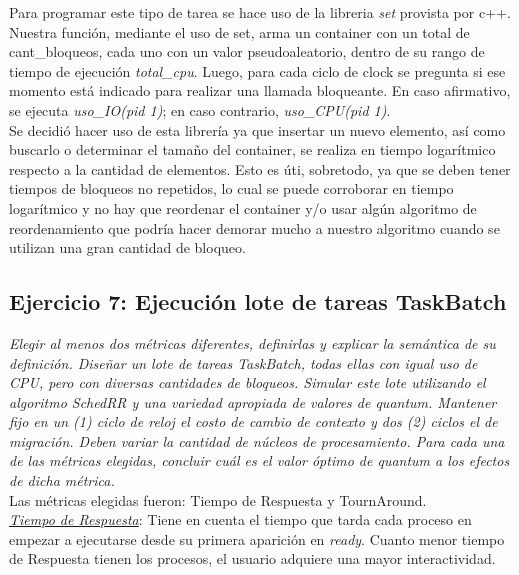\documentclass[a4paper]{article}
\begin{document}
Para programar este tipo de tarea se hace uso de la libreria \emph{set} provista por c++. Nuestra funci\'on, mediante el uso de set, arma un container con un total de cant_bloqueos, cada uno con un valor pseudoaleatorio, dentro de su rango de tiempo de ejecuci\'on \emph{total_cpu}. 
Luego, para cada ciclo de clock se pregunta si ese momento est\'a indicado para realizar una llamada bloqueante. En caso afirmativo, se ejecuta \textit{uso_IO(pid 1)}; en caso contrario, \textit{uso_CPU(pid 1)}.\\
Se decidió hacer uso de esta librería ya que insertar un nuevo elemento, así como buscarlo o determinar el tamaño del container, se realiza en tiempo logarítmico respecto a la cantidad de elementos. Esto es úti, sobretodo, ya que se deben tener tiempos de bloqueos no repetidos, lo cual se puede corroborar en tiempo logarítmico y no hay que reordenar el container y/o usar algún algoritmo de reordenamiento que podría hacer demorar mucho a nuestro algoritmo cuando se utilizan una gran cantidad de bloqueo. 

\bigskip 
 \subsection{Ejercicio 7: Ejecuci\'on lote de tareas TaskBatch}
\textit{Elegir al menos dos m\'etricas diferentes, definirlas y explicar la sem\'antica de su definici\'on. Dise\~nar un lote de tareas TaskBatch, todas ellas con igual uso de CPU, pero con diversas cantidades de bloqueos. Simular este lote utilizando el algoritmo SchedRR y una variedad apropiada de valores de quantum. Mantener fijo en un (1) ciclo de reloj el costo de cambio de contexto y dos (2) ciclos el de migraci\'on. Deben variar la cantidad de n\'ucleos de procesamiento. Para cada una de las m\'etricas elegidas, concluir cu\'al es el valor \'optimo de quantum a los efectos de dicha m\'etrica.}\\



Las m\'etricas elegidas fueron: Tiempo de Respuesta y TournAround.\\


\underline{\emph{Tiempo de Respuesta}}: Tiene en cuenta el tiempo que tarda cada proceso en empezar a ejecutarse desde su primera aparici\'on en \textit{ready}. Cuanto menor tiempo de Respuesta tienen los procesos, el usuario adquiere una mayor interactividad.\\
\end{document}
